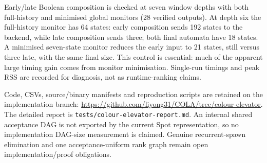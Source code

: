 Early/late Boolean composition is checked at seven window depths with
both full-history and minimised global monitors (28 verified outputs).
At depth six the full-history monitor has 64 states: early composition
sends 192 states to the backend, while late composition sends three;
both final automata have 18 states. A minimised seven-state monitor
reduces the early input to 21 states, still versus three late, with the
same final size. This control is essential: much of the apparent large
timing gain comes from monitor minimisation. Single-run timings and peak
RSS are recorded for diagnosis, not as runtime-ranking claims.

Code, CSVs, source/binary manifests and reproduction scripts are retained
on the implementation branch:
\url{https://github.com/liyong31/COLA/tree/colour-elevator}.
The detailed report is \texttt{tests/colour-elevator-report.md}.
An internal shared acceptance DAG is not exported by the current Spot
representation, so no implementation DAG-size measurement is claimed.
Genuine recurrent-spawn elimination and one acceptance-uniform rank graph
remain open implementation/proof obligations.
